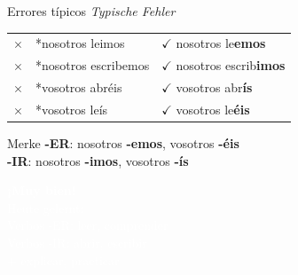\documentclass[aspectratio=169, 11pt]{beamer}
\newcommand{\de}[1]{\textit{\textcolor{mittelgrau}{#1}}}
\newcommand{\ender}[1]{\textcolor{endungER}{\textbf{#1}}}
\newcommand{\endir}[1]{\textcolor{endungIR}{\textbf{#1}}}
\begin{document}
\begin{frame}{Errores típicos \de{Typische Fehler}}
    \vspace{0.5cm}

    \renewcommand{\arraystretch}{1.8}
    \begin{tabular}{cll}
        \textcolor{falsch}{\Large$\times$} & *nosotros le\textcolor{falsch}{imos} & \textcolor{richtig}{\Large$\checkmark$} nosotros le\ender{emos} \\
        \textcolor{falsch}{\Large$\times$} & *nosotros escrib\textcolor{falsch}{emos} & \textcolor{richtig}{\Large$\checkmark$} nosotros escrib\endir{imos} \\
        \textcolor{falsch}{\Large$\times$} & *vosotros abr\textcolor{falsch}{éis} & \textcolor{richtig}{\Large$\checkmark$} vosotros abr\endir{ís} \\
        \textcolor{falsch}{\Large$\times$} & *vosotros le\textcolor{falsch}{ís} & \textcolor{richtig}{\Large$\checkmark$} vosotros le\ender{éis} \\
    \end{tabular}

    \vspace{1cm}

    \begin{block}{Merke}
        \ender{-ER}: nosotros \ender{-emos}, vosotros \ender{-éis}\\
        \endir{-IR}: nosotros \endir{-imos}, vosotros \endir{-ís}
    \end{block}
\end{frame}

\begin{frame}[plain]
    \vspace{3cm}
    \begin{center}
        {\Huge\bfseries\textcolor{white}{¡Muy bien!}}\\[1cm]
        {\Large\textcolor{white}{Heute gelernt:}}\\[0.5cm]
        {\large\textcolor{white}{Verbos -ER: leer, comprender}}\\[0.3cm]
        {\large\textcolor{white}{Verbos -IR: abrir, escribir}}\\[0.3cm]
        {\large\textcolor{white}{+ explicar, practicar}}
    \end{center}
\end{frame}
\end{document}
